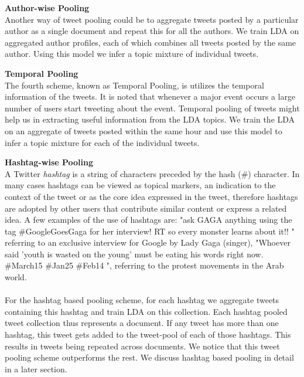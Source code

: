 \documentclass[10pt,a5paper,twoside]{article}
\begin{document}
\begin{compactenum}
\item  \textbf{Author-wise Pooling}
\\
Another way of tweet pooling could be to aggregate tweets posted by a particular author as a single document and repeat this for all the authors. We train LDA on aggregated author profiles, each of which combines all tweets posted by the same author. Using this model we infer a topic mixture of individual tweets.
\\

\item  \textbf{Temporal Pooling}
\\
The fourth scheme, known as Temporal Pooling, is utilizes the temporal information of the tweets. It is noted that whenever a major event occurs a large number of users start tweeting about the event. Temporal pooling of tweets might help us in extracting useful information from the LDA topics. We train the LDA on an aggregate of tweets posted within the same hour and use this model to infer a topic mixture for each of the individual tweets.
\\

\item  \textbf{Hashtag-wise Pooling}
\\
A Twitter \textit{hashtag} is a string of characters preceded by the hash (\#) character. In many cases hashtags can be viewed as topical markers, an indication to the context of the tweet or as the core idea expressed in the tweet, therefore hashtags are adopted by other users that contribute similar content or express a related idea. A few examples of the use of hashtags are: "ask GAGA anything using the tag \#GoogleGoesGaga for her interview! RT so every monster learns about it!! " referring to an exclusive interview for Google by Lady Gaga (singer), "Whoever
said 'youth is wasted on the young' must be eating his words right now. \#March15 \#Jan25 \#Feb14 ", referring to the protest movements in the Arab world.
\\\\
For the hashtag based pooling scheme, for each hashtag we aggregate tweets containing this hashtag and train LDA on this collection. Each hashtag pooled tweet collection thus represents a document. If any tweet has more than one hashtag, this tweet gets added to the tweet-pool of each of those hashtags. This results in tweets being repeated across documents. We notice that this tweet pooling scheme outperforms the rest. We discuss hashtag based pooling in detail in a later section.

\end{compactenum}
\end{document}
